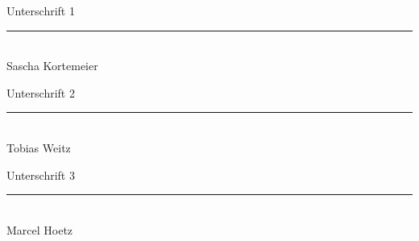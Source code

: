 \documentclass[a4paper, 12pt]{report}
\begin{document}
\begin{flushleft}
Unterschrift 1
\newline \newline
\rule{5cm}{0.4pt}
\\
Sascha Kortemeier
\newline \newline \newline

Unterschrift 2
\newline \newline
\rule{5cm}{0.4pt}
\\
Tobias Weitz
\newline \newline \newline

Unterschrift 3
\newline \newline
\rule{5cm}{0.4pt}
\\
Marcel Hoetz

\end{flushleft}
\end{document}
